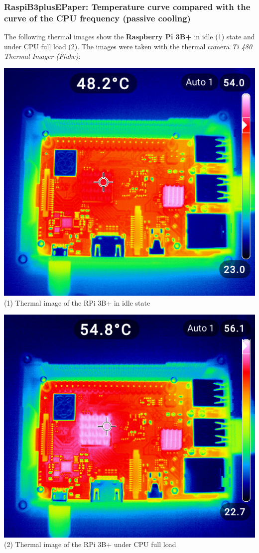 \documentclass [oneside,10pt,a4paper,ngerman,BCOR10mm,headsepline,parindent,final]{scrartcl}
\begin{document}
    \hypertarget{raspib3plusepaper-temperature-curve-compared-with-the-curve-of-the-cpu-frequency-passive-cooling}{%
\subsubsection{RaspiB3plusEPaper: Temperature curve compared with the
curve of the CPU frequency (passive
cooling)}\label{raspib3plusepaper-temperature-curve-compared-with-the-curve-of-the-cpu-frequency-passive-cooling}}

The following thermal images show the \textbf{Raspberry Pi 3B+} in idle
(1) state and under CPU full load (2). The images were taken with the
thermal camera \emph{Ti 480 Thermal Imager (Fluke)}:

\includegraphics{images/thermal_images/RPi3Bplus_thermalImage_idleMode_c.jpg}\\
(1) Thermal image of the RPi 3B+ in idle state

\includegraphics{images/thermal_images/RPi3Bplus_thermalImage_heavyLoadMode_c.jpg}\\
(2) Thermal image of the RPi 3B+ under CPU full load
\end{document}
